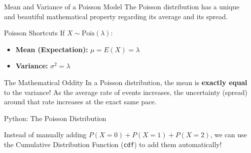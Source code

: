 \begin{frame}{Mean and Variance of a Poisson Model}
    The Poisson distribution has a unique and beautiful mathematical property regarding its average and its spread.

    \vspace{0.3cm}
    \begin{block}{Poisson Shortcuts}
        If $X \sim \text{Pois}(\lambda)$:
        \begin{itemize}
            \item \textbf{Mean (Expectation):} $\mu = E(X) = \lambda$
            \item \textbf{Variance:} $\sigma^2 = \lambda$
        \end{itemize}
    \end{block}

    \pause \vspace{0.3cm}
    \begin{alertblock}{The Mathematical Oddity}
        In a Poisson distribution, the mean is \textbf{exactly equal} to the variance! As the average rate of events increases, the uncertainty (spread) around that rate increases at the exact same pace.
    \end{alertblock}
\end{frame}




\begin{frame}[fragile]{Python: The Poisson Distribution}

    Instead of manually adding $P(X=0) + P(X=1) + P(X=2)$, we can use the Cumulative Distribution Function (\texttt{cdf}) to add them automatically!
 
  
\end{frame}


